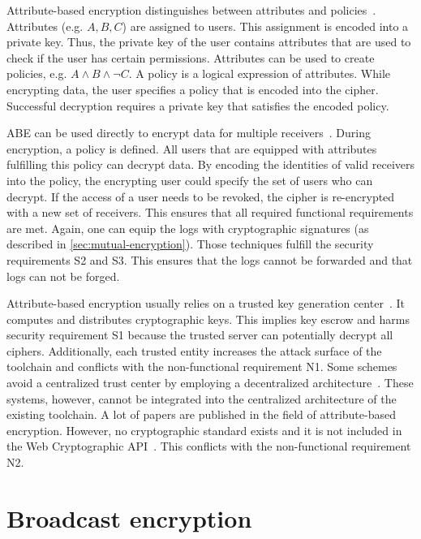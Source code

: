 \documentclass[../main.tex]{subfiles}
\begin{document}
Attribute-based encryption distinguishes between attributes and policies~\cite{Bethencourt2007}.
Attributes (e.g. ${A,B,C}$) are assigned to users.
This assignment is encoded into a private key.
Thus, the private key of the user contains attributes that are used to check if the user has certain permissions.
Attributes can be used to create policies, e.g. $A \land B \land \neg C$.
A policy is a logical expression of attributes.
While encrypting data, the user specifies a policy that is encoded into the cipher.
Successful decryption requires a private key that satisfies the encoded policy.

ABE can be used directly to encrypt data for multiple receivers~\cite{Bethencourt2007}. 
During encryption, a policy is defined. 
All users that are equipped with attributes fulfilling this policy can decrypt data.
By encoding the identities of valid receivers into the policy, the encrypting user could specify the set of users who can decrypt.
If the access of a user needs to be revoked, the cipher is re-encrypted with a new set of receivers.
This ensures that all required functional requirements are met.
Again, one can equip the logs with cryptographic signatures (as described in \cref{sec:mutual-encryption}).
Those techniques fulfill the security requirements S2 and S3.
This ensures that the logs cannot be forwarded and that logs can not be forged.

Attribute-based encryption usually relies on a trusted key generation center~\cite{Sahai2009}.
It computes and distributes cryptographic keys.
This implies key escrow and harms security requirement S1 because the trusted server can potentially decrypt all ciphers.
Additionally, each trusted entity increases the attack surface of the toolchain and conflicts with the non-functional requirement N1.
Some schemes avoid a centralized trust center by employing a decentralized architecture~\cite{Vaanchig2018}.
These systems, however, cannot be integrated into the centralized architecture of the existing toolchain.
A lot of papers are published in the field of attribute-based encryption.
However, no cryptographic standard exists and it is not included in the Web Cryptographic API~\cite{WebCryptoApi2017}.
This conflicts with the non-functional requirement N2.

\section{Broadcast encryption}
\label{sec:broadcast-encryption}
\end{document}
